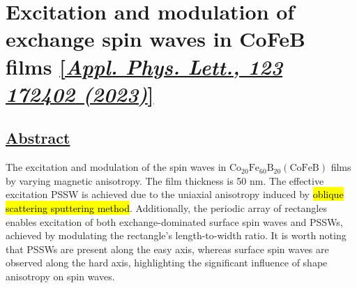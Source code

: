 \section{Excitation and modulation of exchange spin waves in CoFeB films \href{https://doi.org/10.1063/5.0169995}{[\textit{Appl. Phys. Lett., 123 172402 (2023)}]}}


\subsection*{\underline{Abstract}}
The excitation and modulation of the spin waves in $\mathrm{Co_{20}Fe_{60}B_{20}} (\mathrm{CoFeB})$ films by varying magnetic anisotropy. The film thickness is 50 nm. The effective excitation PSSW is achieved due to the uniaxial anisotropy induced by \hl{oblique scattering sputtering method}. Additionally, the periodic array of rectangles enables excitation of both exchange-dominated surface spin waves and PSSWs, achieved by modulating the rectangle's length-to-width ratio. It is worth noting that PSSWs are present along the easy axis, whereas surface spin waves are observed along the hard axis, highlighting the significant influence of shape anisotropy on spin waves.

